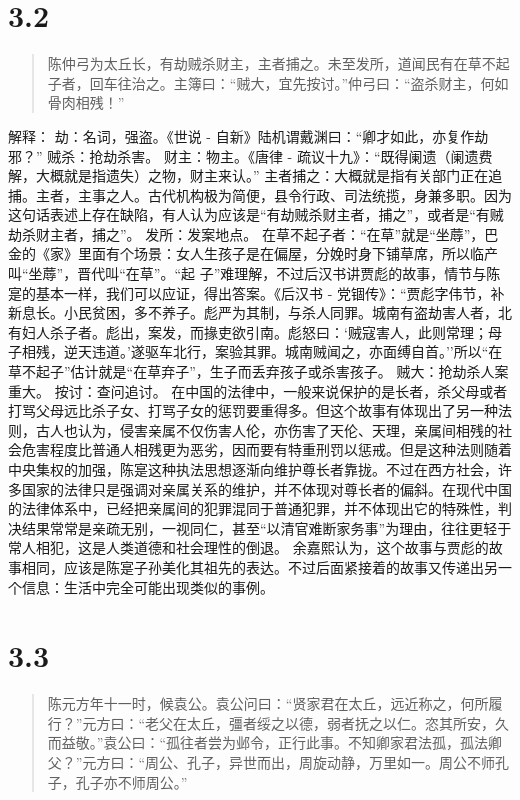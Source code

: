 \documentclass[]{book}
\begin{document}
\section{3.2}\label{section-156}

\begin{quote}
陈仲弓为太丘长，有劫贼杀财主，主者捕之。未至发所，道闻民有在草不起子者，回车往治之。主簿曰：``贼大，宜先按讨。''仲弓曰：``盗杀财主，何如骨肉相残！''
\end{quote}

解释： 劫：名词，强盗。《世说 -
自新》陆机谓戴渊曰：``卿才如此，亦复作劫邪？'' 贼杀：抢劫杀害。
财主：物主。《唐律 -
疏议十九》：``既得阑遗（阑遗费解，大概就是指遗失）之物，财主来认。''
主者捕之：大概就是指有关部门正在追捕。主者，主事之人。古代机构极为简便，县令行政、司法统揽，身兼多职。因为这句话表述上存在缺陷，有人认为应该是``有劫贼杀财主者，捕之''，或者是``有贼劫杀财主者，捕之''。
发所：发案地点。
在草不起子者：``在草''就是``坐蓐''，巴金的《家》里面有个场景：女人生孩子是在偏屋，分娩时身下铺草席，所以临产叫``坐蓐''，晋代叫``在草''。``起
子''难理解，不过后汉书讲贾彪的故事，情节与陈寔的基本一样，我们可以应证，得出答案。《后汉书
-
党锢传》：``贾彪字伟节，补新息长。小民贫困，多不养子。彪严为其制，与杀人同罪。城南有盗劫害人者，北有妇人杀子者。彪出，案发，而掾吏欲引南。彪怒曰：`贼寇害人，此则常理；母子相残，逆天违道。'遂驱车北行，案验其罪。城南贼闻之，亦面缚自首。''所以``在草不起子''估计就是``在草弃子''，生子而丢弃孩子或杀害孩子。
贼大：抢劫杀人案重大。 按讨：查问追讨。
在中国的法律中，一般来说保护的是长者，杀父母或者打骂父母远比杀子女、打骂子女的惩罚要重得多。但这个故事有体现出了另一种法则，古人也认为，侵害亲属不仅伤害人伦，亦伤害了天伦、天理，亲属间相残的社会危害程度比普通人相残更为恶劣，因而要有特重刑罚以惩戒。但是这种法则随着中央集权的加强，陈寔这种执法思想逐渐向维护尊长者靠拢。不过在西方社会，许多国家的法律只是强调对亲属关系的维护，并不体现对尊长者的偏斜。在现代中国的法律体系中，已经把亲属间的犯罪混同于普通犯罪，并不体现出它的特殊性，判决结果常常是亲疏无别，一视同仁，甚至``以清官难断家务事''为理由，往往更轻于常人相犯，这是人类道德和社会理性的倒退。
余嘉熙认为，这个故事与贾彪的故事相同，应该是陈寔子孙美化其祖先的表达。不过后面紧接着的故事又传递出另一个信息：生活中完全可能出现类似的事例。

\section{3.3}\label{section-157}

\begin{quote}
陈元方年十一时，候袁公。袁公问曰：``贤家君在太丘，远近称之，何所履行？''元方曰：``老父在太丘，彊者绥之以德，弱者抚之以仁。恣其所安，久而益敬。''袁公曰：``孤往者尝为邺令，正行此事。不知卿家君法孤，孤法卿父？''元方曰：``周公、孔子，异世而出，周旋动静，万里如一。周公不师孔子，孔子亦不师周公。''
\end{quote}
\end{document}
